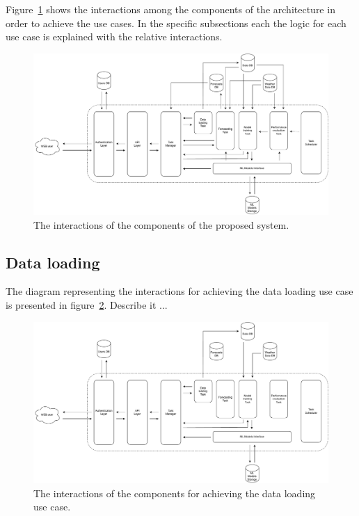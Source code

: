 Figure~\ref{fig:interactions} shows the interactions among the components of the architecture in order to achieve the use cases.
In the specific subsections each the logic for each use case is explained with the relative interactions.

\begin{figure}[H]
\centering
\includegraphics[width=1\textwidth]{images/architecture_interactions}
\caption{The interactions of the components of the proposed system.}
\label{fig:interactions}
\end{figure}


\vspace{0.1 cm}
\subsection{Data loading}
\label{sec:loading}
\vspace{0.1 cm}

The diagram representing the interactions for achieving the data loading use case is presented in figure~\ref{fig:loadinginteractions}.
Describe it ...

\begin{figure}[H]
\centering
\includegraphics[width=1\textwidth]{images/architecture_data_loading_interactions}
\caption{The interactions of the components for achieving the data loading use case.}
\label{fig:loadinginteractions}
\end{figure}

